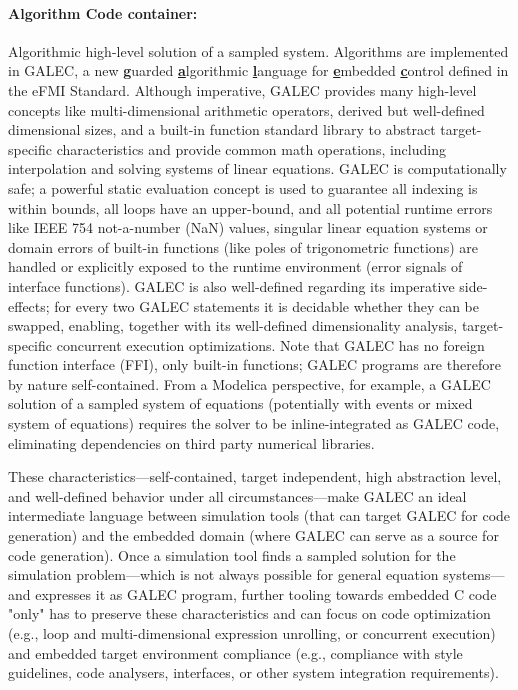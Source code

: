 \paragraph{Algorithm Code container:} Algorithmic high-level solution of a sampled system. Algorithms are implemented in GALEC, a new \underline{\textbf{g}}uarded \underline{\textbf{a}}lgorithmic \underline{\textbf{l}}anguage for \underline{\textbf{e}}mbedded \underline{\textbf{c}}ontrol defined in the eFMI Standard. Although imperative, GALEC provides many high-level concepts like multi-dimensional arithmetic operators, derived but well-defined dimensional sizes, and a built-in function standard library to abstract target-specific characteristics and provide common math operations, including interpolation and solving systems of linear equations. GALEC is computationally safe; a powerful static evaluation concept is used to guarantee all indexing is within bounds, all loops have an upper-bound, and all potential runtime errors like IEEE 754 not-a-number (NaN) values, singular linear equation systems or domain errors of built-in functions (like poles of trigonometric functions) are handled or explicitly exposed to the runtime environment (error signals of interface functions). GALEC is also well-defined regarding its imperative side-effects; for every two GALEC statements it is decidable whether they can be swapped, enabling, together with its well-defined dimensionality analysis, target-specific concurrent execution optimizations. Note that GALEC has no foreign function interface (FFI), only built-in functions; GALEC programs are therefore by nature self-contained. From a Modelica perspective, for example, a GALEC solution of a sampled system of equations (potentially with events or mixed system of equations) requires the solver to be inline-integrated as GALEC code, eliminating dependencies on third party numerical libraries.

These characteristics---self-contained, target independent, high abstraction level, and well-defined behavior under all circumstances---make GALEC an ideal intermediate language between simulation tools (that can target GALEC for code generation) and the embedded domain (where GALEC can serve as a source for code generation). Once a simulation tool finds a sampled solution for the simulation problem---which is not always possible for general equation systems---and expresses it as GALEC program, further tooling towards embedded C code "only" has to preserve these characteristics and can focus on code optimization (e.g., loop and multi-dimensional expression unrolling, or concurrent execution) and embedded target environment compliance (e.g., compliance with style guidelines, code analysers, interfaces, or other system integration requirements).

